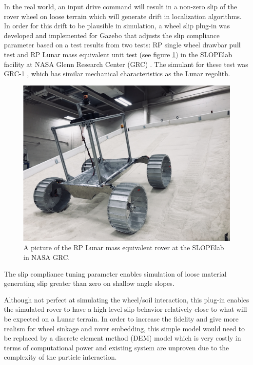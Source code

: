 \documentclass[twocolumn,letterpaper]{IEEEAerospaceCLS}  %
\begin{document}
In the real world, an input drive command will result in a non-zero slip of the rover wheel on loose terrain which will generate drift in localization algorithms.
In order for this drift to be plausible in simulation, a wheel slip plug-in was developed and implemented for Gazebo that adjusts the slip compliance parameter based on a test results from two tests: RP single wheel drawbar pull test and RP Lunar mass equivalent unit test (see figure \ref{fig:mgru}) in the SLOPElab facility at NASA Glenn Research Center (GRC) \cite{nasa2018slope}. 
The simulant for these test was GRC-1 \cite{he2010geotechnical}, which has similar mechanical characteristics as the Lunar regolith.
\begin{figure}[h!]
	\includegraphics[width=\columnwidth]{figures/wheel_slip_MGRU.JPG}
   	\caption{A picture of the RP Lunar mass equivalent rover at the SLOPElab in NASA GRC.}
    \label{fig:mgru}
\end{figure}
The slip compliance tuning parameter enables simulation of loose material generating slip greater than zero on shallow angle slopes.

Although not perfect at simulating the wheel/soil interaction, this plug-in enables the simulated rover to have a high level slip behavior relatively close to what will be expected on a Lunar terrain. 
In order to increase the fidelity and give more realism for wheel sinkage and rover embedding, this simple model would need to be replaced by a discrete element method (DEM) model which is very costly in terms of computational power and existing system are unproven due to the complexity of the particle interaction.
\end{document}
